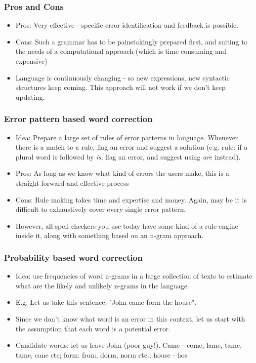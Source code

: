 \documentclass{beamer}
\begin{document}
\begin{frame}
\frametitle{Pros and Cons}
\begin{itemize}
\item Pros: Very effective - specific error identification and feedback is possible.
\item Cons: Such a grammar has to be painstakingly prepared first, and suiting to the needs of a computational approach (which is time consuming and expensive)
\item Language is continuously changing - so new expressions, new syntactic structures keep coming. This approach will not work if we don't keep updating.
\end{itemize}
\end{frame}

\begin{frame}
\frametitle{Error pattern based word correction}
\begin{itemize}
\item Idea: Prepare a large set of rules of error patterns in language. Whenever there is a match to a rule, flag an error and suggest a solution (e.g. rule: if a plural word is followed by \textit{is}, flag an error, and suggest using \textit{are} instead). \pause
\item Pros: As long as we know what kind of errors the users make, this is a straight forward and effective process
\item Cons: Rule making takes time and expertise and money. Again, may be it is difficult to exhaustively cover every single error pattern.
\item However, all spell checkers you use today have some kind of a rule-engine inside it, along with something based on an n-gram approach.
\end{itemize}
\end{frame}

\begin{frame}
\frametitle{Probability based word correction}
\begin{itemize}
\item Idea: use frequencies of word n-grams in a large collection of texts to estimate what are the likely and unlikely n-grams in the language. \pause
\item E.g, Let us take this sentence: "John came form the house".
\item Since we don't know what word is an error in this context, let us start with the assumption that each word is a potential error.
\item Candidate words: let us leave John (poor guy!). Came - come, lame, tame, tame, cane etc; form: from, dorm, norm etc.; house - hos
\end{itemize}
\end{frame}
\end{document}
